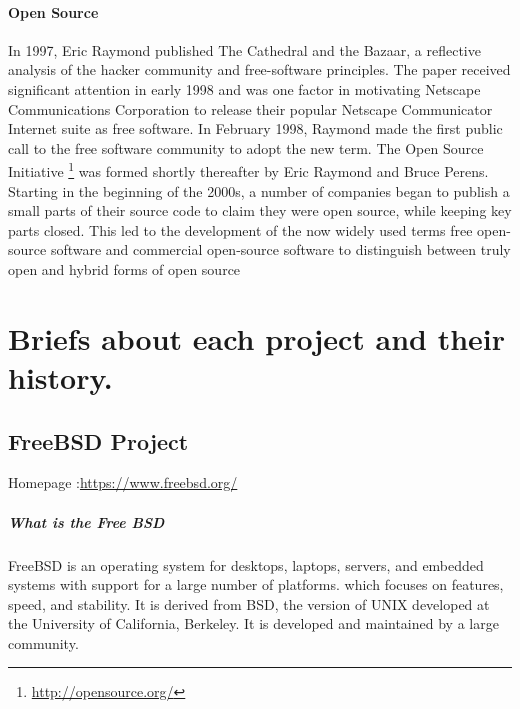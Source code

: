 \documentclass[11pt]{article} %
\begin{document}
\paragraph{Open Source}
In 1997, Eric Raymond published The Cathedral and the Bazaar, a reflective analysis of the hacker community and free-software principles. The paper received significant attention in early 1998 and was one factor in motivating Netscape Communications Corporation to release their popular Netscape Communicator Internet suite as free software. 
In February 1998, Raymond made the first public call to the free software community to adopt the new term. The Open Source Initiative \footnote{\url{http://opensource.org/}} was formed shortly thereafter by Eric Raymond and Bruce Perens.\\
Starting in the beginning of the 2000s, a number of companies began to publish a small parts of their source code to claim they were open source, while keeping key parts closed. This led to the development of the now widely used terms free open-source software and commercial open-source software to distinguish between truly open and hybrid forms of open source
\section{Briefs about each project and their history.}
\subsection{FreeBSD Project }
 Homepage :\url {https://www.freebsd.org/}\\

\subparagraph{What is the Free BSD}

FreeBSD is an operating system for desktops, laptops, servers, and embedded systems with support for a large number of platforms. which focuses on features, speed, and stability. It is derived from BSD, the version of UNIX developed at the University of California, Berkeley. It is developed and maintained by a large community.\\
\end{document}
